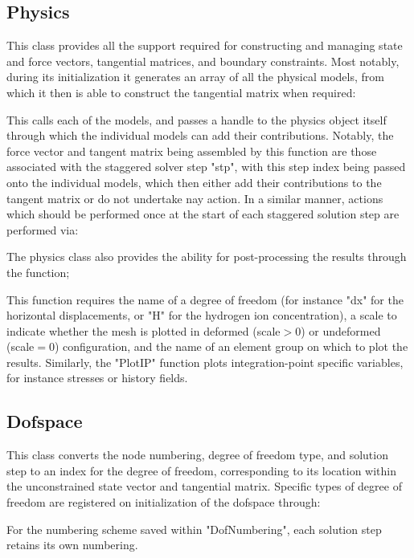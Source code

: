 \documentclass[3p]{elsarticle} %
\begin{document}
\subsection{Physics}
This class provides all the support required for constructing and managing state and force vectors, tangential matrices, and boundary constraints. Most notably, during its initialization it generates an array of all the physical models, from which it then is able to construct the tangential matrix when required:

This calls each of the models, and passes a handle to the physics object itself through which the individual models can add their contributions. Notably, the force vector and tangent matrix being assembled by this function are those associated with the staggered solver step "stp", with this step index being passed onto the individual models, which then either add their contributions to the tangent matrix or do not undertake nay action. In a similar manner, actions which should be performed once at the start of each staggered solution step are performed via:


The physics class also provides the ability for post-processing the results through the function;

This function requires the name of a degree of freedom (for instance "dx" for the horizontal displacements, or "H" for the hydrogen ion concentration), a scale to indicate whether the mesh is plotted in deformed (scale$>$0) or undeformed (scale$=$0) configuration, and the name of an element group on which to plot the results. Similarly, the "PlotIP" function plots integration-point specific variables, for instance stresses or history fields.

\subsection{Dofspace}
This class converts the node numbering, degree of freedom type, and solution step to an index for the degree of freedom, corresponding to its location within the unconstrained state vector and tangential matrix. Specific types of degree of freedom are registered on initialization of the dofspace through:

For the numbering scheme saved within "DofNumbering", each solution step retains its own numbering. 
\end{document}
